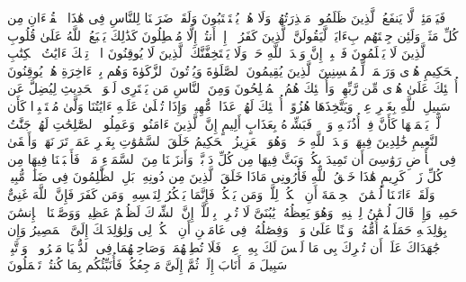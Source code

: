 \startbuffer[\q:30:57]
فَیَوۡمَئِذࣲ لَّا یَنفَعُ ٱلَّذِینَ ظَلَمُوا۟ مَعۡذِرَتُهُمۡ وَلَا هُمۡ یُسۡتَعۡتَبُونَ%
\stopbuffer
\startbuffer[\q:30:58]
وَلَقَدۡ ضَرَبۡنَا لِلنَّاسِ فِی هَٰذَا ٱلۡقُرۡءَانِ مِن كُلِّ مَثَلࣲۚ وَلَئِن جِئۡتَهُم بِءَایَةࣲ لَّیَقُولَنَّ ٱلَّذِینَ كَفَرُوۤا۟ إِنۡ أَنتُمۡ إِلَّا مُبۡطِلُونَ%
\stopbuffer
\startbuffer[\q:30:59]
كَذَٰلِكَ یَطۡبَعُ ٱللَّهُ عَلَىٰ قُلُوبِ ٱلَّذِینَ لَا یَعۡلَمُونَ%
\stopbuffer
\startbuffer[\q:30:60]
فَٱصۡبِرۡ إِنَّ وَعۡدَ ٱللَّهِ حَقࣱّۖ وَلَا یَسۡتَخِفَّنَّكَ ٱلَّذِینَ لَا یُوقِنُونَ%
\stopbuffer
\startbuffer[\q:31:1]
الۤمۤ%
\stopbuffer
\startbuffer[\q:31:2]
تِلۡكَ ءَایَٰتُ ٱلۡكِتَٰبِ ٱلۡحَكِیمِ%
\stopbuffer
\startbuffer[\q:31:3]
هُدࣰى وَرَحۡمَةࣰ لِّلۡمُحۡسِنِینَ%
\stopbuffer
\startbuffer[\q:31:4]
ٱلَّذِینَ یُقِیمُونَ ٱلصَّلَوٰةَ وَیُؤۡتُونَ ٱلزَّكَوٰةَ وَهُم بِٱلۡءَاخِرَةِ هُمۡ یُوقِنُونَ%
\stopbuffer
\startbuffer[\q:31:5]
أُو۟لَٰۤئِكَ عَلَىٰ هُدࣰى مِّن رَّبِّهِمۡۖ وَأُو۟لَٰۤئِكَ هُمُ ٱلۡمُفۡلِحُونَ%
\stopbuffer
\startbuffer[\q:31:6]
وَمِنَ ٱلنَّاسِ مَن یَشۡتَرِی لَهۡوَ ٱلۡحَدِیثِ لِیُضِلَّ عَن سَبِیلِ ٱللَّهِ بِغَیۡرِ عِلۡمࣲ وَیَتَّخِذَهَا هُزُوًاۚ أُو۟لَٰۤئِكَ لَهُمۡ عَذَابࣱ مُّهِینࣱ%
\stopbuffer
\startbuffer[\q:31:7]
وَإِذَا تُتۡلَىٰ عَلَیۡهِ ءَایَٰتُنَا وَلَّىٰ مُسۡتَكۡبِرࣰا كَأَن لَّمۡ یَسۡمَعۡهَا كَأَنَّ فِیۤ أُذُنَیۡهِ وَقۡرࣰاۖ فَبَشِّرۡهُ بِعَذَابٍ أَلِیمٍ%
\stopbuffer
\startbuffer[\q:31:8]
إِنَّ ٱلَّذِینَ ءَامَنُوا۟ وَعَمِلُوا۟ ٱلصَّٰلِحَٰتِ لَهُمۡ جَنَّٰتُ ٱلنَّعِیمِ%
\stopbuffer
\startbuffer[\q:31:9]
خَٰلِدِینَ فِیهَاۖ وَعۡدَ ٱللَّهِ حَقࣰّاۚ وَهُوَ ٱلۡعَزِیزُ ٱلۡحَكِیمُ%
\stopbuffer
\startbuffer[\q:31:10]
خَلَقَ ٱلسَّمَٰوَٰتِ بِغَیۡرِ عَمَدࣲ تَرَوۡنَهَاۖ وَأَلۡقَىٰ فِی ٱلۡأَرۡضِ رَوَٰسِیَ أَن تَمِیدَ بِكُمۡ وَبَثَّ فِیهَا مِن كُلِّ دَاۤبَّةࣲۚ وَأَنزَلۡنَا مِنَ ٱلسَّمَاۤءِ مَاۤءࣰ فَأَنۢبَتۡنَا فِیهَا مِن كُلِّ زَوۡجࣲ كَرِیمٍ%
\stopbuffer
\startbuffer[\q:31:11]
هَٰذَا خَلۡقُ ٱللَّهِ فَأَرُونِی مَاذَا خَلَقَ ٱلَّذِینَ مِن دُونِهِۦۚ بَلِ ٱلظَّٰلِمُونَ فِی ضَلَٰلࣲ مُّبِینࣲ%
\stopbuffer
\startbuffer[\q:31:12]
وَلَقَدۡ ءَاتَیۡنَا لُقۡمَٰنَ ٱلۡحِكۡمَةَ أَنِ ٱشۡكُرۡ لِلَّهِۚ وَمَن یَشۡكُرۡ فَإِنَّمَا یَشۡكُرُ لِنَفۡسِهِۦۖ وَمَن كَفَرَ فَإِنَّ ٱللَّهَ غَنِیٌّ حَمِیدࣱ%
\stopbuffer
\startbuffer[\q:31:13]
وَإِذۡ قَالَ لُقۡمَٰنُ لِٱبۡنِهِۦ وَهُوَ یَعِظُهُۥ یَٰبُنَیَّ لَا تُشۡرِكۡ بِٱللَّهِۖ إِنَّ ٱلشِّرۡكَ لَظُلۡمٌ عَظِیمࣱ%
\stopbuffer
\startbuffer[\q:31:14]
وَوَصَّیۡنَا ٱلۡإِنسَٰنَ بِوَٰلِدَیۡهِ حَمَلَتۡهُ أُمُّهُۥ وَهۡنًا عَلَىٰ وَهۡنࣲ وَفِصَٰلُهُۥ فِی عَامَیۡنِ أَنِ ٱشۡكُرۡ لِی وَلِوَٰلِدَیۡكَ إِلَیَّ ٱلۡمَصِیرُ%
\stopbuffer
\startbuffer[\q:31:15]
وَإِن جَٰهَدَاكَ عَلَىٰۤ أَن تُشۡرِكَ بِی مَا لَیۡسَ لَكَ بِهِۦ عِلۡمࣱ فَلَا تُطِعۡهُمَاۖ وَصَاحِبۡهُمَا فِی ٱلدُّنۡیَا مَعۡرُوفࣰاۖ وَٱتَّبِعۡ سَبِیلَ مَنۡ أَنَابَ إِلَیَّۚ ثُمَّ إِلَیَّ مَرۡجِعُكُمۡ فَأُنَبِّئُكُم بِمَا كُنتُمۡ تَعۡمَلُونَ%
